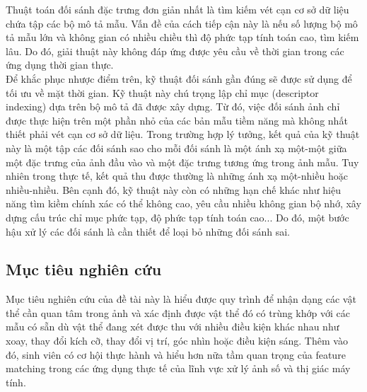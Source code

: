 Thuật toán đối sánh đặc trưng đơn giản nhất là tìm kiếm vét cạn cơ sở dữ liệu chứa tập các bộ mô tả mẫu. Vấn đề của cách tiếp cận này là nếu số lượng bộ mô tả mẫu lớn và không gian có nhiều chiều thì độ phức tạp tính toán cao, tìm kiếm lâu. Do đó, giải thuật này không đáp ứng được yêu cầu về thời gian trong các ứng dụng thời gian thực.\\

Để khắc phục nhược điểm trên, kỹ thuật đối sánh gần đúng sẽ được sử dụng để tối ưu về mặt thời gian. Kỹ thuật này chú trọng lập chỉ mục (descriptor indexing) dựa trên bộ mô tả đã được xây dựng. Từ đó, việc đối sánh ảnh chỉ được thực hiện trên một phần nhỏ của các bản mẫu tiềm năng mà không nhất thiết phải vét cạn cơ sở dữ liệu. Trong trường hợp lý tưởng, kết quả của kỹ thuật này là một tập các đối sánh sao cho mỗi đối sánh là một ánh xạ một-một giữa một đặc trưng của ảnh đầu vào và một đặc trưng tương ứng trong ảnh mẫu. Tuy nhiên trong thực tế, kết quả thu được thường là những ánh xạ một-nhiều hoặc nhiều-nhiều. Bên cạnh đó, kỹ thuật này còn có những hạn chế khác như hiệu năng tìm kiềm chính xác có thể không cao, yêu cầu nhiều không gian bộ nhớ, xây dựng cấu trúc chỉ mục phức tạp, độ phức tạp tính toán cao... Do đó, một bước hậu xử lý các đối sánh là cần thiết để loại bỏ những đối sánh sai.

\subsection{Mục tiêu nghiên cứu}
Mục tiêu nghiên cứu của đề tài này là hiểu được quy trình để nhận dạng các vật thể cần quan tâm trong ảnh và xác định được vật thể đó có trùng khớp với các mẫu có sẵn dù vật thể đang xét được thu với nhiều điều kiện khác nhau như xoay, thay đổi kích cỡ, thay đổi vị trí, góc nhìn hoặc điều kiện sáng. Thêm vào đó, sinh viên có cơ hội thực hành và hiểu hơn nữa tầm quan trọng của feature matching trong các ứng dụng thực tế của lĩnh vực xử lý ảnh số và thị giác máy tính.